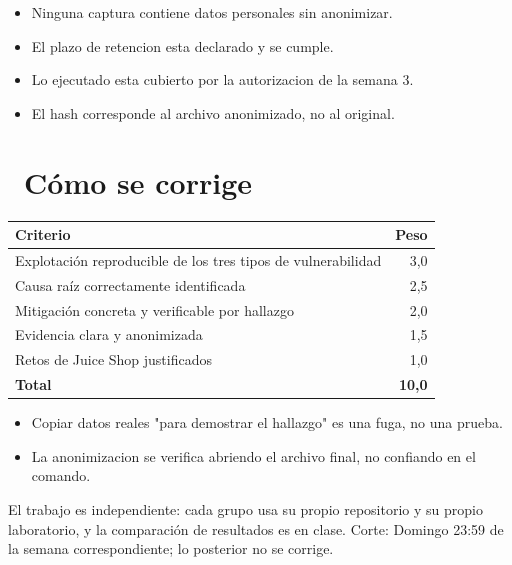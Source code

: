 \documentclass[11pt,a4paper]{article}
\newcommand{\iconotexto}[2]{\textcolor{cyanNeon}{\faIcon{#1}}~#2}
\begin{document}
\begin{itemize}[leftmargin=1.4em,itemsep=2pt,topsep=3pt]
  \item Ninguna captura contiene datos personales sin anonimizar.
  \item El plazo de retencion esta declarado y se cumple.
  \item Lo ejecutado esta cubierto por la autorizacion de la semana 3.
  \item El hash corresponde al archivo anonimizado, no al original.
\end{itemize}

\section{\iconotexto{ruler-combined}{Cómo se corrige}}

\begin{tabularx}{\linewidth}{@{}X r@{}}
\toprule
Criterio & Peso\\
\midrule
Explotación reproducible de los tres tipos de vulnerabilidad & 3,0 \\
Causa raíz correctamente identificada & 2,5 \\
Mitigación concreta y verificable por hallazgo & 2,0 \\
Evidencia clara y anonimizada & 1,5 \\
Retos de Juice Shop justificados & 1,0 \\
\midrule
\textbf{Total} & \textbf{10,0}\\
\bottomrule
\end{tabularx}

\begin{itemize}[leftmargin=1.4em,itemsep=2pt,topsep=3pt]
  \item Copiar datos reales "para demostrar el hallazgo" es una fuga, no una prueba.
  \item La anonimizacion se verifica abriendo el archivo final, no confiando en el comando.
\end{itemize}

\begin{cajaRecuerda}El trabajo es independiente: cada grupo usa su propio repositorio y su propio laboratorio, y la comparación de resultados es en clase. Corte: Domingo 23:59 de la semana correspondiente; lo posterior no se corrige.
\end{cajaRecuerda}
\end{document}
